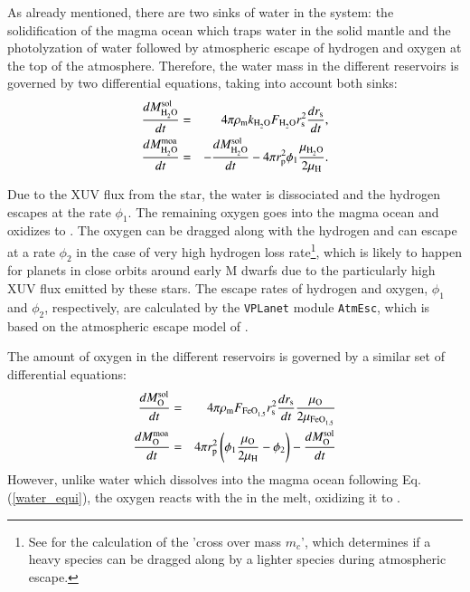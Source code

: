 \documentclass[oneside,twocolumn]{article}
\newcommand{\vplanet}{\texttt{\footnotesize{VPLanet}}}
\newcommand{\atmesc}{\texttt{\footnotesize{AtmEsc}}}
\begin{document}
As already mentioned, there are two sinks of water in the system: the solidification of the magma ocean which traps water in the solid mantle and the photolyzation of water followed by atmospheric escape of hydrogen and oxygen at the top of the atmosphere.
Therefore, the water mass in the different reservoirs is governed by two differential equations, taking into account both sinks:
\begin{eqnarray}
	\label{Deriv_Watersol}
	\frac{dM_{\ce{H2O}}^{\mathrm{sol}}}{dt} &=& 4 \pi \rho_\mathrm{m}  k_{\ce{H2O}} F_{\ce{H2O}} r_\mathrm{s}^2 \frac{d r_\mathrm{s}}{dt}, \\
	\frac{dM_{\ce{H2O}}^{\mathrm{moa}}}{dt} &=& - \frac{dM_{\ce{H2O}}^{\mathrm{sol}}}{dt} - 4 \pi r_\mathrm{p}^2 \phi_1 \frac{\mu_{\ce{H2O}}}{2 \mu_{\ce{H}}}.
	\label{Dervi_Watermo}
\end{eqnarray}

Due to the XUV flux from the star, the water is dissociated and the hydrogen escapes at the rate $\phi_1$.
The remaining oxygen goes into the magma ocean and oxidizes  to .
The oxygen can be dragged along with the hydrogen and can escape at a rate $\phi_2$ in the case of very high hydrogen loss rate\footnote{See \citet{Hunten1987} for the calculation of the 'cross over mass $m_c$', which determines if a heavy species can be dragged along by a lighter species during atmospheric escape.}, which is likely to happen for planets in close orbits around early M dwarfs due to the particularly high XUV flux emitted by these stars. The escape rates of hydrogen and oxygen, 
$\phi_1$ and $\phi_2$, respectively, are calculated by the \vplanet{} module \atmesc{}, which is based on the atmospheric escape model of \citet{Luger2015a}.

The amount of oxygen in the different reservoirs is governed by a similar set of differential equations:
\begin{eqnarray}
	\label{Deriv_Oxysol}
	\frac{dM_{\ce{O}}^{\mathrm{sol}}}{dt} &=& 4 \pi \rho_\mathrm{m}  F_{\ce{FeO_{1.5}}} r_\mathrm{s}^2 \frac{d r_\mathrm{s}}{dt} \frac{\mu_{\ce{O}}}{2 \mu_{\ce{FeO_{1.5}}}}\\
	\frac{dM_{\ce{O}}^{\mathrm{moa}}}{dt} &=& 4 \pi r_\mathrm{p}^2 \left(  \phi_1 \frac{\mu_{\ce{O}}}{2 \mu_{\ce{H}}} - \phi_2 \right) - \frac{dM_{\ce{O}}^{\mathrm{sol}}}{dt}
	\label{Deriv_Oxymo}
\end{eqnarray}
However, unlike water which dissolves into the magma ocean following Eq. (\ref{water_equi}), the oxygen reacts with the  in the melt, oxidizing it to .
\end{document}
